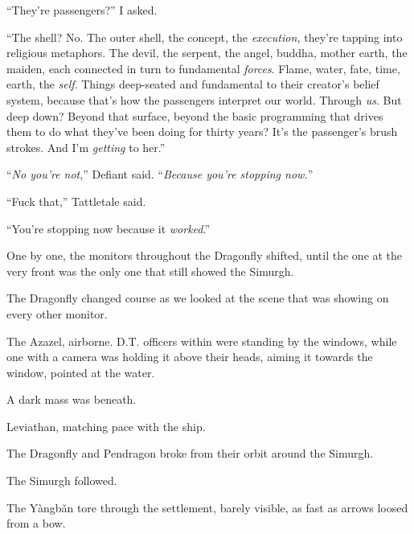 ``They're passengers?'' I asked.



``The shell?  No.  The outer shell, the concept, the \emph{execution, }they're tapping into religious metaphors.  The devil, the serpent, the angel, buddha, mother earth, the maiden, each connected in turn to fundamental \emph{forces}.  Flame, water, fate, time, earth, the \emph{self}.  Things deep-seated and fundamental to their creator's belief system, because that's how the passengers interpret our world.  Through \emph{us}.  But deep down?  Beyond that surface, beyond the basic programming that drives them to do what they've been doing for thirty years?  It's the passenger's brush strokes.  And I'm \emph{getting} to her.''



``\emph{No you're not},'' Defiant said.  ``\emph{Because you're stopping now.}''



``Fuck that,'' Tattletale said.



``You're stopping now because it \emph{worked}.''



One by one, the monitors throughout the Dragonfly shifted, until the one at the very front was the only one that still showed the Simurgh.



The Dragonfly changed course as we looked at the scene that was showing on every other monitor.



The Azazel, airborne.  D.T. officers within were standing by the windows, while one with a camera was holding it above their heads, aiming it towards the window, pointed at the water.



A dark mass was beneath.



Leviathan, matching pace with the ship.



The Dragonfly and Pendragon broke from their orbit around the Simurgh.



The Simurgh followed.



\blacksquare



The Y\`{a}ngb\v{a}n tore through the settlement, barely visible, as fast as arrows loosed from a bow.



